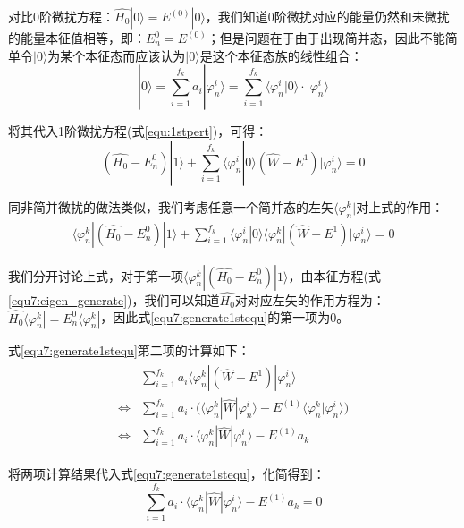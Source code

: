 对比0阶微扰方程：$ \hat{H_0}|0\rangle=E^{(0)}|0\rangle$，我们知道0阶微扰对应的能量仍然和未微扰的能量本征值相等，即：$E_n^0=E^{(0)}$；但是问题在于由于出现简并态，因此不能简单令$|0\rangle$为某个本征态而应该认为$|0\rangle$是这个本征态族的线性组合：
\begin{equation}\label{equ7:generate_linearcomb}
    |0\rangle=\sum_{i=1}^{f_k}a_i|\varphi_n^i\rangle=\sum_{i=1}^{f_k}\langle\varphi_n^i|0\rangle\cdot|\varphi_n^i\rangle
\end{equation}

将其代入1阶微扰方程(式\eqref{equ:1stpert})，可得：
\begin{equation}
    (\hat{H_0}-E_n^0)|1\rangle+\sum_{i=1}^{f_k}\langle\varphi_n^i|0\rangle(\hat{W}-E^{1})|\varphi_n^i\rangle=0
\end{equation}

同非简并微扰的做法类似，我们考虑任意一个简并态的左矢$\langle\varphi_n^k|$对上式的作用：
\begin{align}\label{equ7:generate1stequ}
        \langle\varphi_n^k|(\hat{H_0}-E_n^0)|1\rangle+\sum_{i=1}^{f_k}\langle\varphi_n^i|0\rangle\langle\varphi_n^k|(\hat{W}-E^{1})|\varphi_n^i\rangle=0
\end{align}

我们分开讨论上式，对于第一项$\langle\varphi_n^k|(\hat{H_0}-E_n^0)|1\rangle$，由本征方程(式\eqref{equ7:eigen_generate})，我们可以知道$\hat{H_0}$对对应左矢的作用方程为：$\hat{H_0}\langle\varphi_n^k|=E_n^0\langle\varphi_n^k|$，因此式\eqref{equ7:generate1stequ}的第一项为0。

式\eqref{equ7:generate1stequ}第二项的计算如下：
\begin{align}
    \begin{split}
        &\sum_{i=1}^{f_k}a_i\langle\varphi_n^k|(\hat{W}-E^{1})|\varphi_n^i\rangle\\
        \Longleftrightarrow& \sum_{i=1}^{f_k}a_i\cdot \Big( \langle\varphi_n^k|\hat{W}|\varphi_n^i\rangle-E^{(1)}\langle\varphi_n^k|\varphi_n^i\rangle\Big)\\
         \Longleftrightarrow& \sum_{i=1}^{f_k}a_i\cdot\langle\varphi_n^k|\hat{W}|\varphi_n^i\rangle-E^{(1)}a_k
    \end{split}
\end{align}

将两项计算结果代入式\eqref{equ7:generate1stequ}，化简得到：
\begin{equation}\label{equ7:generante_secularequ}
    \sum_{i=1}^{f_k}a_i\cdot\langle\varphi_n^k|\hat{W}|\varphi_n^i\rangle-E^{(1)}a_k=0
\end{equation}

